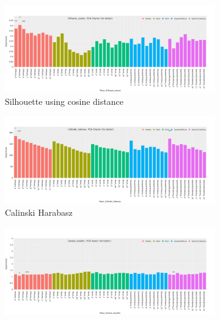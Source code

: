 \begin{figure}[H]
    \captionsetup[subfigure]{justification=Centering}
    \centering
    \begin{subfigure}[!t]{0.85\textwidth}
        \includegraphics[width=\textwidth]{Sections/ClusteringAnalysis/Resources/cs_top3/PCA_top3_Silhoute_cosine.png}
        \caption{Silhouette using cosine distance}
        \label{fig:cs:cosine}
    \end{subfigure}
    \centering
    \begin{subfigure}[!t]{0.85\textwidth}
        \includegraphics[width=\textwidth]{Sections/ClusteringAnalysis/Resources/cs_top3/PCA_top3_Calinski_habrasz.png}
        \caption{Calinski Harabasz}
        \label{fig:cs:cal_hab}
    \end{subfigure}
    \centering
    \begin{subfigure}[!t]{0.85\textwidth}
        \includegraphics[width=\textwidth]{Sections/ClusteringAnalysis/Resources/cs_top3/PCA_top3_Davies_bouldin.png}

\end{subfigure}
\end{figure}
